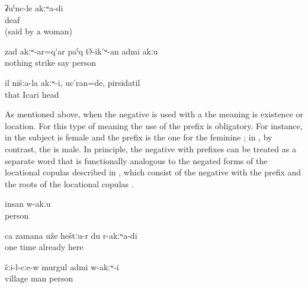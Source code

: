 \begin{exe}
	\ex	\label{ex:I am not deaf}
	\gll	ʡuˁnc-le	akːʷa-di\\
		deaf	\\
	\glt	{} (said by a woman)

	\ex	\label{ex:He is not the person who beats without anything}
	\gll	zad	akːʷ-ar=q'ar	paˁq	Ø-ik'ʷ-an	admi	akːu\\
		nothing		strike	say	person	\\
	\glt	{}

	\ex	\label{ex:He was not one of us, he was Icari, the head (of the kolkhoz)}
	\gll	il	nišːa-la	akːʷ-i,		uc'ran=de,	pirsidatil\\
		that				Icari	head\\
	\glt	{}
\end{exe}

As mentioned above, when the negative  is used with a   the meaning is existence or location. For this type of meaning the use of the prefix is obligatory. For instance, in  the subject is female and the  prefix is the one for the feminine ; in , by contrast, the  is male. In principle, the negative  with  prefixes can be treated as a separate word that is functionally analogous to the negated forms of the locational copulas described in , which consist of the negative  with the  prefix and the roots of the locational copulas .

\begin{exe}
	\ex	\label{ex:Nobody is there}
	\gll	insan	w-akːu\\
		person	\\
	\glt	{}

	\ex	\label{ex:At one time I was already not there anymore}
	\gll	ca	zamana	uže	heštːu-r	du	r-akːʷa-di\\
		one	time	already	here		\\
	\glt	{}

	\ex	\label{ex:In the village there was no man}
	\gll	šːi-l-cːe-w	murgul	admi	w-akːʷ-i\\
		village	man	person	\\
	\glt	{}
\end{exe}


